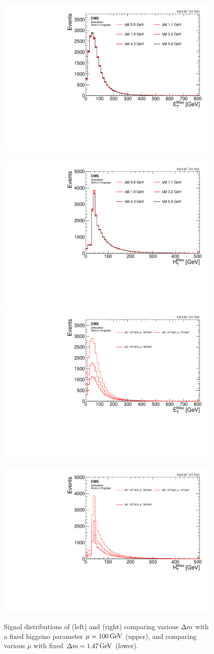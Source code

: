 \begin{figure}[!htb]
\centering
\includegraphics[width=0.48\linewidth]{plots/signal_common_distributions_fixed_mu/none_MET.pdf} \,
\includegraphics[width=0.48\linewidth]{plots/signal_common_distributions_fixed_mu/none_MHT.pdf}  \\
\includegraphics[width=0.48\linewidth]{plots/signal_common_distributions_fixed_dm/none_MET.pdf} \,
\includegraphics[width=0.48\linewidth]{plots/signal_common_distributions_fixed_dm/none_MHT.pdf}  \\
\caption[Signal $\MET$ and $\mht$ distributions]{ Signal distributions of \MET (left) and \mht (right) comparing various $\Delta m$ with a fixed higgsino parameter $\mu=100\,\text{Ge\hspace{-.08em}V}$ (upper), and comparing various $\mu$ with fixed $\Delta m=1.47\,\text{Ge\hspace{-.08em}V}$ (lower).}
\label{fig:signal-met-mht}
\end{figure}

